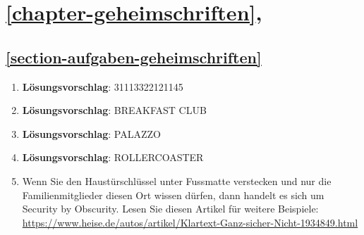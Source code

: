 
\section{\autoref{chapter-geheimschriften}, }

\subsection*{\ref{section-aufgaben-geheimschriften} }

\begin{enumerate}

\item \textbf{Lösungsvorschlag}: 31113322121145

\item \textbf{Lösungsvorschlag}: BREAKFAST CLUB

\item \textbf{Lösungsvorschlag}: {\pigpenfont PALAZZO}

\item \textbf{Lösungsvorschlag}: ROLLERCOASTER

\item Wenn Sie den Haustürschlüssel unter Fussmatte verstecken und nur die Familienmitglieder diesen Ort wissen dürfen, dann handelt es sich um Security by Obscurity. Lesen Sie diesen Artikel für weitere Beispiele: \url{https://www.heise.de/autos/artikel/Klartext-Ganz-sicher-Nicht-1934849.html}

\end{enumerate}